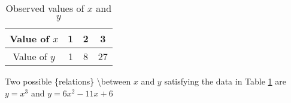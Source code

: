 \documentclass[12pt]{article}
\begin{document}
\begin{table}[h]
\caption{Observed  values  of  $x$  and  $y$}
\label{tabxy}
	\begin{center}
		\begin{tabular}{|c|c|c|c|}
			\hline
			Value  of  $x$  &  1  &  2  &  3\\
			\hline
			Value  of  $y$  &  1  &  8  &  27\\
			\hline
		\end{tabular}
	\end{center}
\end{table}

Two  possible      \{relations\}   \textbackslash between  $x$  and  $y$  satisfying
the  data  in  Table \ref{tabxy}  are  $y=x^3$  and $y=6x^2-11x+6$
\end{document}

